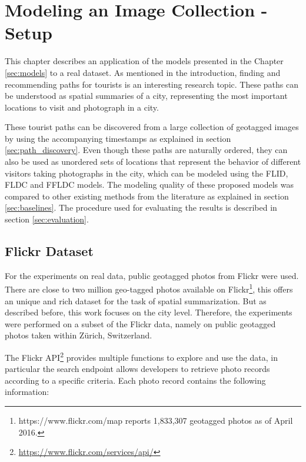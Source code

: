 \chapter{Modeling an Image Collection - Setup}
\label{sec:experimental_setup}

This chapter describes an application of the models presented in the Chapter \ref{sec:models} to a real dataset. As mentioned in the introduction, finding and recommending paths for tourists is an interesting research topic. These paths can be understood as spatial summaries of a city, representing the most important locations to visit and photograph in a city.

These tourist paths can be discovered from a large collection of geotagged images by using the accompanying timestamps as explained in section \ref{sec:path_discovery}. Even though these paths are naturally ordered, they can also be used as unordered sets of locations that represent the behavior of different visitors taking photographs in the city, which can be modeled using the FLID, FLDC and FFLDC models. The modeling quality of these proposed models was compared to other existing methods from the literature as explained in section \ref{sec:baselines}. The procedure used for evaluating the results is described in section \ref{sec:evaluation}.

\section{Flickr Dataset}

For the experiments on real data, public geotagged photos from Flickr were used. There are close to two million geo-tagged photos available on Flickr\footnote{https://www.flickr.com/map reports 1,833,307 geotagged photos as of April 2016.}, this offers an unique and rich dataset for the task of spatial summarization. But as described before, this work focuses on the city level. Therefore, the experiments were performed on a subset of the Flickr data, namely on public geotagged photos taken within Zürich, Switzerland.

The Flickr API\footnote{\url{https://www.flickr.com/services/api/}} provides multiple functions to explore and use the data, in particular the search endpoint allows developers to retrieve photo records according to a specific criteria. Each photo record contains the following information:

